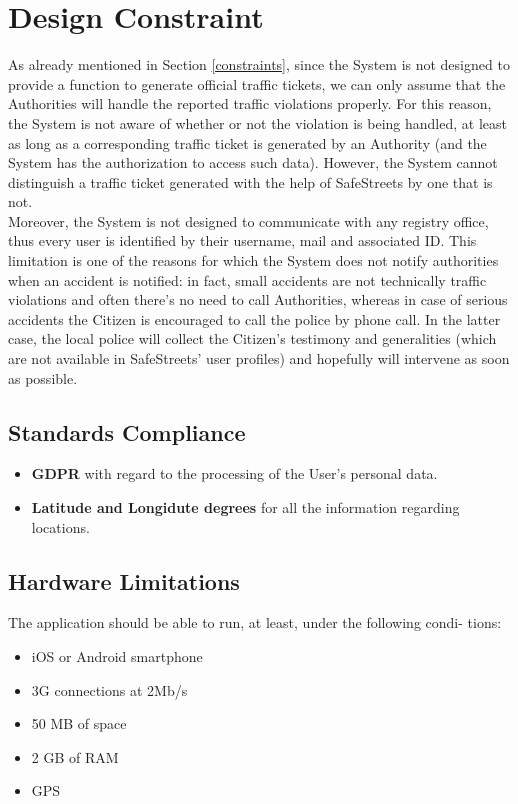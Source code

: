 \documentclass{report}
\begin{document}
\section{Design Constraint}
As already mentioned in Section \ref{constraints}, since the System is not designed to provide a function to generate official traffic tickets, we can only assume that the Authorities will handle the reported traffic violations properly. For this reason, the System is not aware of whether or not the violation is being handled, at least as long as a corresponding traffic ticket is generated by an Authority (and the System has the authorization to access such data). However, the System cannot distinguish a traffic ticket generated with the help of SafeStreets by one that is not.
\\
Moreover, the System is not designed to communicate with any registry office, thus every user is identified by their username, mail and associated ID. This limitation is one of the reasons for which the System does not notify authorities when an accident is notified: in fact, small accidents are not technically traffic violations and often there's no need to call Authorities, whereas in case of serious accidents the Citizen is encouraged to call the police by phone call. In the latter case, the local police will collect the Citizen's testimony and generalities (which are not available in SafeStreets' user profiles) and hopefully will intervene as soon as possible. 
\subsection{Standards Compliance}
\begin{itemize}
	\item \textbf{GDPR} with regard to the processing of the User's personal data.
	\item \textbf{Latitude and Longidute degrees} for all the information regarding locations.
\end{itemize}
\subsection{Hardware Limitations}
The application should be able to run, at least, under the following condi-
tions:
\begin{itemize}
	\item iOS or Android smartphone
	\item 3G connections at 2Mb/s
	\item 50 MB of space
	\item 2 GB of RAM
	\item GPS
\end{itemize}
\end{document}
